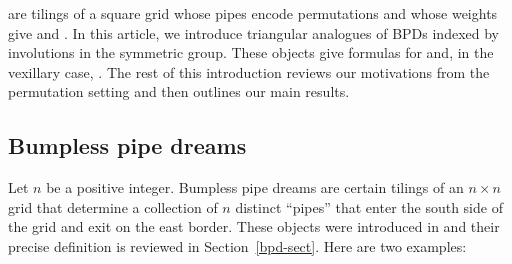 \documentclass[10pt]{article}
\begin{document}
 are tilings of a square grid whose pipes encode permutations and whose weights give  and . In this article, we introduce triangular analogues of BPDs indexed by involutions in the symmetric group. These objects give formulas for  and, in the vexillary case, .
The rest of this introduction reviews our motivations from the permutation
setting and then outlines our main results.


\subsection{Bumpless pipe dreams}

Let $n$ be a 
  positive integer.
Bumpless pipe dreams are certain tilings of an $n\times n$ grid that determine a collection of $n$ distinct ``pipes'' that enter the south side of the grid and exit on the east border.
These objects were introduced in \cite{LLS} and their 
precise definition is reviewed in Section~\ref{bpd-sect}. Here are 
two examples:
\be\label{bpd-ex1}
\end{document}
